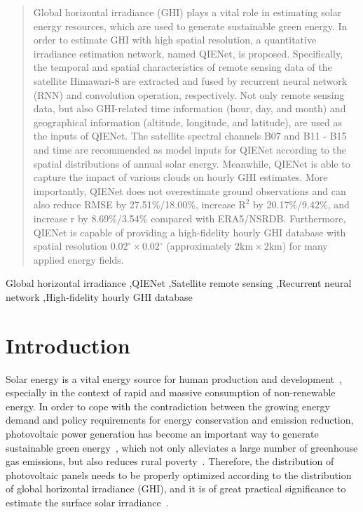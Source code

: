 \documentclass[review]{elsarticle}
\begin{document}
\begin{frontmatter}
    \begin{abstract}
        Global horizontal irradiance (GHI) plays a vital role in estimating solar energy resources, which are used to generate sustainable green energy.
        In order to estimate GHI with high spatial resolution, a quantitative irradiance estimation network, named QIENet, is proposed.
        Specifically, the temporal and spatial characteristics of remote sensing data of the satellite Himawari-8 are extracted and fused by recurrent neural network (RNN) and convolution operation, respectively.
        Not only remote sensing data, but also GHI-related time information (hour, day, and month) and geographical information (altitude, longitude, and latitude), are used as the inputs of QIENet.
        The satellite spectral channels B07 and B11 - B15 and time are recommended as model inputs for QIENet according to the spatial distributions of annual solar energy.
        Meanwhile, QIENet is able to capture the impact of various clouds on hourly GHI estimates.
        More importantly, QIENet does not overestimate ground observations and can also reduce RMSE by 27.51\%/18.00\%, increase $\mathrm{R^{2}}$ by 20.17\%/9.42\%, and increase r by 8.69\%/3.54\% compared with ERA5/NSRDB.
        Furthermore, QIENet is capable of providing a high-fidelity hourly GHI database with spatial resolution $0.02^{\circ}\times0.02^{\circ}$ (approximately $\mathrm{2km \times 2km}$) for many applied energy fields.
    \end{abstract}
    \begin{keyword}
        Global horizontal irradiance \sep QIENet \sep Satellite remote sensing \sep Recurrent neural network \sep High-fidelity hourly GHI database
    \end{keyword}
\end{frontmatter}


\section{Introduction}
\label{section:1}
Solar energy is a vital energy source for human production and development~\citep{Lord2021598}, especially in the context of rapid and massive consumption of non-renewable energy.
In order to cope with the contradiction between the growing energy demand and policy requirements for energy conservation and emission reduction, photovoltaic power generation has become an important way to generate sustainable green energy~\citep{Kruitwagen2021, Joshi2021}, which not only alleviates a large number of greenhouse gas emissions, but also reduces rural poverty~\citep{Zhang2020}.
Therefore, the distribution of photovoltaic panels needs to be properly optimized according to the distribution of global horizontal irradiance (GHI), and it is of great practical significance to estimate the surface solar irradiance~\citep{HUANG2019111371}.
\end{document}
